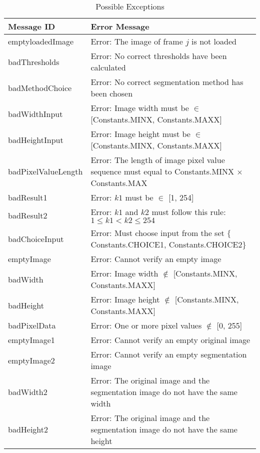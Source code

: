 \documentclass[12pt, titlepage]{article}
\begin{document}
\begin{longtable}{l p{12cm}}
\caption{Possible Exceptions} \\
\toprule
\textbf{Message ID} & \textbf{Error Message} \\
\midrule
emptyloadedImage & Error: The image of frame $j$ is not loaded\\
badThresholds & Error: No correct thresholds have been calculated\\
badMethodChoice & Error: No correct segmentation method has been chosen\\
badWidthInput & Error: Image width must be $\in$ [Constants.MINX,
Constants.MAXX]\\
badHeightInput & Error: Image height must be $\in$ [Constants.MINX,
Constants.MAXX]\\
badPixelValueLength & Error: The length of image pixel value sequence must equal
to Constants.MINX $\times$ Constants.MAX\\
badResult1 & Error: $k1$ must be $\in$ [1, 254]\\
badResult2 & Error: $k1$ and $k2$ must follow this rule: $1 \le k1 < k2 \le
254$\\
badChoiceInput & Error: Must choose input from the set $\{$Constants.CHOICE1,
Constants.CHOICE2$\}$\\
emptyImage & Error: Cannot verify an empty image\\
badWidth & Error: Image width $\not\in$ [Constants.MINX, Constants.MAXX]\\
badHeight & Error: Image height $\not\in$ [Constants.MINX, Constants.MAXX]\\
badPixelData & Error: One or more pixel values $\not\in$ [0, 255]\\
emptyImage1 & Error: Cannot verify an empty original image\\
emptyImage2 & Error: Cannot verify an empty segmentation image\\
badWidth2 & Error: The original image and the segmentation image do not have the
same width\\
badHeight2 & Error: The original image and the segmentation image do not have
the same height\\
\bottomrule
\end{longtable}
\end{document}
